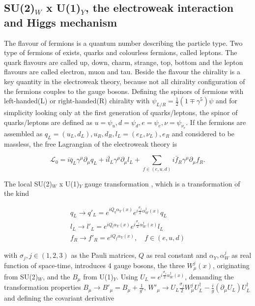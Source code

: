 \subsection{SU(2)$_{W}$ x U(1)$_{Y}$, the electroweak interaction and Higgs mechanism}
\label{sec:section_1_1_3}

The flavour of fermions is a quantum number describing the particle type. Two type of fermions of exists, quarks and colourless fermions, called leptons. The quark flavours are called up, down, charm, strange, top, bottom and the lepton flavours are called electron, muon and tau. Beside the flavour the chirality is a key quantity in the electroweak theory, because not all chirality configuration of the fermions couples to the gauge bosons. Defining the spinors of fermions with left-handed(L) or right-handed(R) chirality with $\psi_{L/R} = \frac{1}{2}(1\mp \gamma^{5})\psi$ and for simplicity looking only at the first generation of quarks/leptons, the spinor of quarks/leptons are defined as $u = \psi_{u}, d = \psi_{d}, e = \psi_{e}, \nu = \psi_{\nu_{e}}$. If the fermions are assembled as $q_{L} = (u_{L}, d_{L}), u_{R}, d_{R}, l_{L} = (e_{L}, \nu_{L}), e_{R}$ and considered to be massless, the free Lagrangian of the electroweak theory is

\begin{equation}
	\label{eq:eq_1_5}
	\mathcal{L}_{0} = i\bar{q}_{L}\gamma^{\mu}\partial_{\mu}q_{L} + i\bar{l}_{L}\gamma^{\mu}\partial_{\mu}l_{L} + \sum_{f \in (e, u, d)} i\bar{f}_{R}\gamma^{\mu}\partial_{\mu}f_{R}.
\end{equation}

The local SU(2)$_{W}$ x U(1)$_{Y}$ gauge transformation \cite{EWK}, which is a transformation of the kind

\begin{equation}
	\label{eq:eq_1_6}
	\begin{split}
		q_{L} \rightarrow q'_{L} = e^{iQ_{q} \alpha_{Y}(x)} e^{i\frac{\sigma_{j}}{2}\alpha^{j}_{W}(x)}q_{L} \\
		l_{L} \rightarrow l'_{L} = e^{iQ_{l} \alpha_{Y}(x)} e^{i\frac{\sigma_{j}}{2}\alpha^{j}_{W}(x)}l_{L} \\
		f_{R} \rightarrow f'_{R} = e^{iQ_{f} \alpha_{Y}(x)}, \quad f \in (e, u, d)
	\end{split}			
\end{equation}

with $\sigma_{j}, j \in (1,2,3)$ as the Pauli matrices, $Q$ as real constant and $\alpha_{Y}, \alpha^{j}_{W}$ as real function of space-time, introduces 4 gauge bosons, the three $W^{j}_{\mu}(x)$, originating from SU(2)$_{W}$, and the $B_{\mu}$ from U(1)$_{Y}$. Using $U_{L} = e^{i\frac{\sigma_{j}}{2}\alpha^{j}_{W}(x)}$, demanding the transformation properties $B_{\mu} \rightarrow B'_{\mu} = B_{\mu} + \frac{1}{g'}$, $W'_{\mu} \rightarrow U_{L}\frac{\sigma_{j}}{2}W_{\mu}^{j}U_{L}^{\dagger} - \frac{i}{g}(\partial_{\mu}U_{L})U_{L}^{\dagger}$ and defining the covariant derivative 

